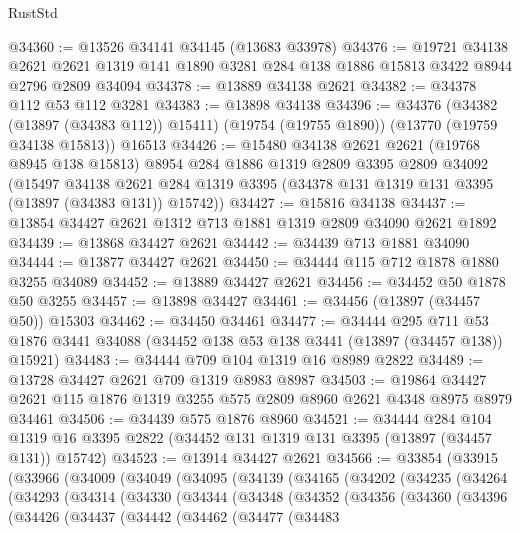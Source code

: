 \begin{lexlean}{RustStd}
\begin{coremodule}
@34360 := @13526 @34141 @34145 (@13683 @33978)
@34376 := @19721
    @34138
    @2621
    @2621
    @1319
    @141
    @1890
    @3281
    @284
    @138
    @1886
    @15813
    @3422
    @8944
    @2796
    @2809
    @34094
@34378 := @13889 @34138 @2621
@34382 := @34378 @112 @53 @112 @3281
@34383 := @13898 @34138
@34396 := @34376
    (@34382 (@13897 (@34383 @112)) @15411)
    (@19754 (@19755 @1890))
    (@13770 (@19759 @34138 @15813))
    @16513
@34426 := @15480
    @34138
    @2621
    @2621
    (@19768 @8945 @138 @15813)
    @8954
    @284
    @1886
    @1319
    @2809
    @3395
    @2809
    @34092
    (@15497
      @34138
      @2621
      @284
      @1319
      @3395
      (@34378 @131 @1319 @131 @3395 (@13897 (@34383 @131)) @15742))
@34427 := @15816 @34138
@34437 := @13854 @34427 @2621 @1312 @713 @1881 @1319 @2809 @34090 @2621 @1892
@34439 := @13868 @34427 @2621
@34442 := @34439 @713 @1881 @34090
@34444 := @13877 @34427 @2621
@34450 := @34444 @115 @712 @1878 @1880 @3255 @34089
@34452 := @13889 @34427 @2621
@34456 := @34452 @50 @1878 @50 @3255
@34457 := @13898 @34427
@34461 := @34456 (@13897 (@34457 @50)) @15303
@34462 := @34450 @34461
@34477 := @34444
    @295
    @711
    @53
    @1876
    @3441
    @34088
    (@34452 @138 @53 @138 @3441 (@13897 (@34457 @138)) @15921)
@34483 := @34444 @709 @104 @1319 @16 @8989 @2822
@34489 := @13728 @34427 @2621 @709 @1319 @8983 @8987
@34503 := @19864 @34427 @2621 @115 @1876 @1319 @3255 @575 @2809 @8960 @2621 @4348 @8975 @8979 @34461
@34506 := @34439 @575 @1876 @8960
@34521 := @34444
    @284
    @104
    @1319
    @16
    @3395
    @2822
    (@34452 @131 @1319 @131 @3395 (@13897 (@34457 @131)) @15742)
@34523 := @13914 @34427 @2621
@34566 := @33854
    (@33915
      (@33966
        (@34009
          (@34049
            (@34095
              (@34139
                (@34165
                  (@34202
                    (@34235
                      (@34264
                        (@34293
                          (@34314
                            (@34330
                              (@34344
                                (@34348
                                  (@34352
                                    (@34356
                                      (@34360
                                        (@34396
                                          (@34426
                                            (@34437
                                              (@34442
                                                (@34462
                                                  (@34477
                                                    (@34483

\end{coremodule}
\end{lexlean}
